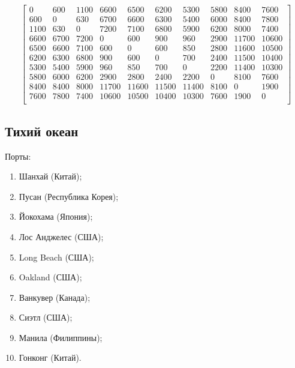 \[
    \begin{bmatrix}
        0    & 600  & 1100 & 6600  & 6500  & 6200  & 5300  & 5800 & 8400  & 7600  \\
        600  & 0    & 630  & 6700  & 6600  & 6300  & 5400  & 6000 & 8400  & 7800  \\
        1100 & 630  & 0    & 7200  & 7100  & 6800  & 5900  & 6200 & 8000  & 7400  \\
        6600 & 6700 & 7200 & 0     & 600   & 900   & 960   & 2900 & 11700 & 10600 \\
        6500 & 6600 & 7100 & 600   & 0     & 600   & 850   & 2800 & 11600 & 10500 \\
        6200 & 6300 & 6800 & 900   & 600   & 0     & 700   & 2400 & 11500 & 10400 \\
        5300 & 5400 & 5900 & 960   & 850   & 700   & 0     & 2200 & 11400 & 10300 \\
        5800 & 6000 & 6200 & 2900  & 2800  & 2400  & 2200  & 0    & 8100  & 7600  \\
        8400 & 8400 & 8000 & 11700 & 11600 & 11500 & 11400 & 8100 & 0     & 1900  \\
        7600 & 7800 & 7400 & 10600 & 10500 & 10400 & 10300 & 7600 & 1900  & 0     \\
    \end{bmatrix}
\]

\subsection*{Тихий океан}
Порты:

\begin{enumerate}
    \item Шанхай (Китай);
    \item Пусан (Республика Корея);
    \item Йокохама (Япония);
    \item Лос Анджелес (США);
    \item Long Beach (США);
    \item Oakland (США);
    \item Ванкувер (Канада);
    \item Сиэтл (США);
    \item Манила (Филиппины);
    \item Гонконг (Китай).
\end{enumerate}


